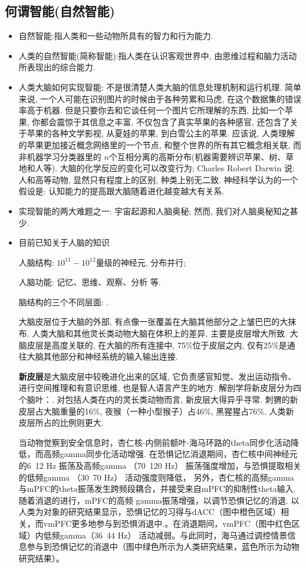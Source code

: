 \subsection{何谓智能(自然智能)}
\begin{itemize}
\item 自然智能:指人类和一些动物所具有的智力和行为能力.

\item 人类的自然智能(简称智能):指人类在认识客观世界中, 由思维过程和脑力活动所表现出的综合能力.

\item 人类大脑如何实现智能: 不是很清楚人类大脑的信息处理机制和运行机理. 简单来说, 一个人可能在识别图片的时候由于各种劳累和马虎, 在这个数据集的错误率高于机器.
但是只要你去和它谈任何一个图片它所理解的东西, 比如一个苹果, 你都会震惊于其信息之丰富, 不仅包含了真实苹果的各种感官, 还包含了关于苹果的各种文学影视, 从夏娃的苹果, 到白雪公主的苹果.
应该说, 人类理解的苹果更加接近概念网络里的一个节点, 和整个世界的所有其它概念相关联,  而非机器学习分类器里的 $n$个互相分离的高斯分布(机器需要辨识苹果、树、草地和人等).
       大脑的化学反应的变化可以改变行为; Charles Robert Darwin 说: 人和高等动物, 显然只有程度上的区别, 种类上别无二致. 神经科学认为的一个假设是: 认知能力的提高跟大脑随着进化越变越大有关系.
\item 实现智能的两大难题之一: 宇宙起源和人脑奥秘; 然而, 我们对人脑奥秘知之甚少.

\item 目前已知关于人脑的知识

      人脑结构: $10^{11}-10^{12}$量级的神经元, 分布并行;

      人脑功能: 记忆、思维、观察、分析 等.

      脑结构的三个不同层面: .

       大脑皮层位于大脑的外部, 有点像一张覆盖在大脑其他部分之上皱巴巴的大抹布.
      人类大脑和其他灵长类动物大脑在体积上的差异, 主要是皮层增大所致.
      大脑皮层是高度关联的, 在大脑的所有连接中, 75\%位于皮层之内, 仅有25\%是通往大脑其他部分和神经系统的输入输出连接.

      \textbf{新皮层}是大脑皮层中较晚进化出来的区域, 它负责感官知觉、发出运动指令、进行空间推理和有意识思维, 也是智人语言产生的地方.
      解剖学将新皮层分为四个脑叶：. 对包括人类在内的灵长类动物而言, 新皮层大得异乎寻常.
      刺猬的新皮层占大脑重量的16\%, 夜猴（一种小型猴子）占46\%, 黑猩猩占76\%. 人类新皮层所占的比例则更大.
      
      当动物觉察到安全信息时，杏仁核-内侧前额叶-海马环路的theta同步化活动降低，而高频gamma同步化活动增强. 在恐惧记忆消退期间，杏仁核中间神经元的6~12 Hz 振荡及高频gamma （70~120 Hz） 振荡强度增加，与恐惧提取相关的低频gamma （30~70 Hz） 活动强度则降低， 另外，杏仁核的高频gamma与mPFC的theta振荡发生跨频段耦合，并接受来自mPFC的抑制性theta输入. 随着消退的进行，mPFC的高频 gamma振荡增强，以调节恐惧记忆的消退. 以人类为对象的研究结果显示，恐惧记忆的习得与dACC（图中橙色区域）相关，而vmPFC更多地参与到恐惧消退中.。在消退期间，vmPFC（图中红色区域）内低频gamma（36~44 Hz） 活动减弱。与此同时，海马通过调控情景信息参与到恐惧记忆的消退中（图中绿色所示为人类研究结果，蓝色所示为动物研究结果）。
      

\end{itemize}
